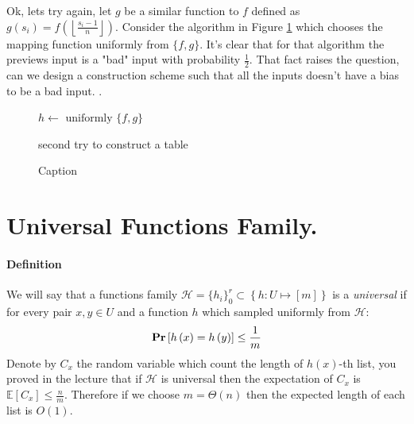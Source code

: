 Ok, lets try again, let \(g\) be a similar function to \(f\) defined as \( g\left(s_{i}\right) =  f\left(\left\lfloor \frac{s_i - 1}{n} \right\rfloor \right)\).
Consider the algorithm in Figure \ref{fig:my_label} which chooses the mapping function uniformly from \(\{f,g\}\). It's clear that for that algorithm the previews input is a "bad" input with probability \(\frac{1}{2}\). 
That fact raises the question, can we design a construction scheme such that all the inputs doesn't have a bias to be a bad input. . 

\begin{figure}[h!]
    \centering
    \begin{algorithm}[H]
        \SetAlgoLined
         \(h \leftarrow \text{ uniformly } \{ f,g \} \)
         \ \\ 
         \caption{second try to construct a table}
    \end{algorithm}
    \caption{Caption}
    \label{fig:my_label}
\end{figure}

\newpage

\section{Universal Functions Family.}

\paragraph{Definition} We will say that a functions family \( \mathcal{H} = \{ h_i \}_{0}^{r} \subset \left\{ h : U \mapsto \left[m\right] \right\} \) is a \textit{universal} if for every pair \( x,y \in U \) and a function \(h\) which sampled uniformly from \(\mathcal{H} \): \begin{equation*}
    \mathbf{Pr} \left[ { h\left(x\right) = h\left(y\right) } \right] \le \frac{1}{m} 
\end{equation*}  
Denote by \( C_x \) the random variable which count the length of \(h\left(x\right)\)-th list, you proved in the lecture that if \(\mathcal{H}\) is universal then the expectation of \(C_x\) is \( \mathbb{E}\left[C_x\right] \le \frac{n}{m} \). Therefore if we choose \( m = \Theta \left(n \right)\) then the expected length of each list is \( O(1) \).   

